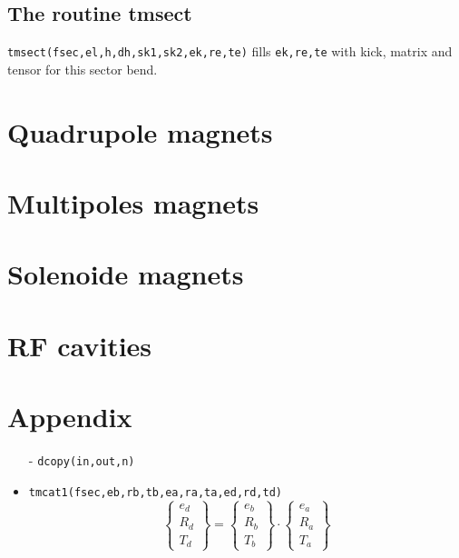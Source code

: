 \documentclass{cern-art} %
\begin{document}
\subsection{The routine {tmsect}}
\lstinline[firstnumber=last]{tmsect(fsec,el,h,dh,sk1,sk2,ek,re,te)} fills \lstinline[firstnumber=last]{ek,re,te} with kick, matrix and tensor for this sector bend.

\section{Quadrupole magnets}

\section{Multipoles magnets}

\section{Solenoide magnets}

\section{RF cavities}

\appendix
\section{Appendix}
\begin{itemize}
\item[-] \lstinline[firstnumber=last]{dcopy(in,out,n)}
\item[-] \lstinline[firstnumber=last]{tmcat1(fsec,eb,rb,tb,ea,ra,ta,ed,rd,td)}$$\left\{ \begin{array}{c}
e_{d}\\
R_{d}\\
T_{d}
\end{array}\right\} =\left\{ \begin{array}{c}
e_{b}\\
R_{b}\\
T_{b}
\end{array}\right\} \cdot\left\{ \begin{array}{c}
e_{a}\\
R_{a}\\
T_{a}
\end{array}\right\} $$
\end{itemize}
\end{document}
